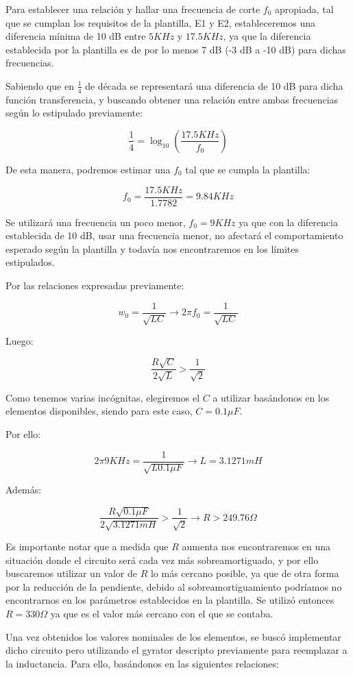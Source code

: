 Para establecer una relación y hallar una frecuencia de corte $f_0$ apropiada, tal que se cumplan los requisitos
de la plantilla, E1 y E2, estableceremos una diferencia mínima de 10 dB entre $5 KHz$ y $17.5 KHz$, ya que la diferencia establecida por la plantilla
es de por lo menos 7 dB (-3 dB a -10 dB) para dichas frecuencias.

Sabiendo que en $\frac{1}{4}$ de década se representará una diferencia de 10 dB para dicha función transferencia, y buscando obtener una
relación entre ambas frecuencias según lo estipulado previamente:

$$\frac{1}{4}=\log_{10}(\frac{17.5KHz}{f_0})$$

De esta manera, podremos estimar una $f_0$ tal que se cumpla la plantilla:

$$f_0 = \frac{17.5KHz}{1.7782} = 9.84 KHz$$

Se utilizará una frecuencia un poco menor, $f_0=9 KHz$ ya que con la diferencia establecida de 10 dB, usar una frecuencia menor, no afectará el comportamiento 
esperado según la plantilla y todavía nos encontraremos en los límites estipulados.

Por las relaciones expresadas previamente:

$$w_0=\frac{1}{\sqrt{LC}} \longrightarrow 2\pi f_0=\frac{1}{\sqrt{LC}}$$

Luego:

$$\frac{R\sqrt{C}}{2\sqrt{L}} > \frac{1}{\sqrt{2}}$$

Como tenemos varias incógnitas, elegiremos el $C$ a utilizar basándonos en los elementos disponibles, siendo para este caso,
$C=0.1\mu F$.

Por ello:

$$2\pi 9KHz=\frac{1}{\sqrt{L0.1 \mu F}} \longrightarrow L = 3.1271 mH$$

Además:

$$\frac{R\sqrt{0.1\mu F}}{2\sqrt{3.1271mH}} > \frac{1}{\sqrt{2}} \longrightarrow R > 249.76 \Omega $$

Es importante notar que a medida que $R$ aumenta nos encontraremos en una situación donde el circuito será
cada vez más sobreamortiguado, y por ello buscaremos utilizar un valor de $R$ lo más cercano posible, ya que de otra forma
por la reducción de la pendiente, debido al sobreamortiguamiento podríamos no encontrarnos en los parámetros establecidos en la plantilla. 
Se utilizó entonces $R= 330 \Omega$ ya que es el valor más cercano con el que se contaba.

Una vez obtenidos los valores nominales de los elementos, se buscó implementar dicho circuito pero utilizando el gyrator descripto previamente
para reemplazar a la inductancia. Para ello, basándonos 
en las siguientes relaciones:

